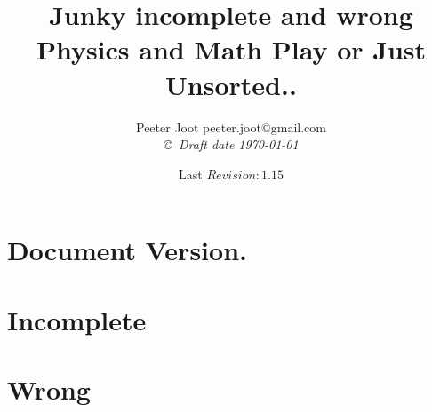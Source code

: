 \documentclass[12pt,leqno]{book}
\date{ Last $Revision: 1.15 $ }
\begin{document}

\title{Junky incomplete and wrong Physics and Math Play or Just Unsorted..}
\author{Peeter Joot  \quad peeter.joot@gmail.com \\
{\small\em \copyright \  Draft date \today }}

\maketitle

\clearpage{}
\tableofcontents

\clearpage{}

\pagestyle{plain}




\part{Document Version.}


\part{Incomplete}



%
%
%










%
%
%
%
%

\part{Wrong}

%

\end{document}
